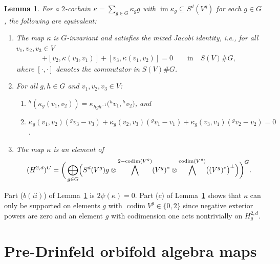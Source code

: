 \documentclass[pdftex]{sigma}
\numberwithin{equation}{section}
\newtheorem{Lemma}[Theorem]{Lemma}
\newcommand{\actby}[1]{{}^{#1}}
\DeclareMathOperator{\im}{im}
\DeclareMathOperator{\codim}{codim}
\begin{document}
\begin{Lemma}\label{ineedaname}
	For a $2$-cochain $\kappa=\sum_{g\in G}\kappa_g g$ with $\im \kappa_g\subseteq S^d(V^g)$ for each $g\in G$,
	the following are equivalent:
	\begin{enumerate}\itemsep=0pt
		\item[$(a)$] The map $\kappa$ is $G$-invariant and satisfies
		the mixed Jacobi identity, i.e., for all $v_1,v_2,v_3\in V$
		\begin{gather*}
		[v_1,\kappa(v_2,v_3)]+[v_2,\kappa(v_3,v_1)]+[v_3,\kappa(v_1,v_2)]=0\qquad
\text{in}\quad S(V)\# G,
		\end{gather*}
		where $[\cdot,\cdot]$ denotes the commutator in $S(V)\# G$.
		\item[$(b)$] For all $g,h\in G$ and $v_1,v_2,v_3\in V$:
		\begin{enumerate}\itemsep=0pt
			\item[$(i)$] $\actby{h}(\kappa_g(v_1,v_2))=\kappa_{hgh^{-1}}\big(\actby{h}v_1,\actby{h}v_2\big)$, and
			\item[$(ii)$] $\kappa_g(v_1,v_2)(\actby{g}v_3-v_3)
			+\kappa_g(v_2,v_3)(\actby{g}v_1-v_1)
			+\kappa_g(v_3,v_1)(\actby{g}v_2-v_2)=0$.
		\end{enumerate}
		\item[$(c)$] The map $\kappa$ is an element of
		\begin{gather*}
		(H^{2,d})^G=\bigg(\bigoplus_{g \in G}
		\Bigl(
		S^d(V^{g})g \otimes
		\bigwedge^{2-\codim(V^g)}(V^g)^{*} \otimes
		\bigwedge^{\codim(V^g)}\bigl((V^g)^*\bigr)^{\perp}
		\Bigr)\bigg)^G.
		\end{gather*}
	\end{enumerate}
\end{Lemma}

\begin{Remark}\label{remark:codim}
	Part ($b(ii)$) of Lemma~\ref{ineedaname} is $2\psi(\kappa)=0$.
	Part ($c$) of Lemma~\ref{ineedaname} shows that $\kappa$ can only be supported
	on elements $g$ with $\codim V^g\in\{0,2\}$ since negative exterior powers
	are zero and an element $g$ with codimension one acts nontrivially on $H_g^{2,d}$.
\end{Remark}

\section{Pre-Drinfeld orbifold algebra maps}\label{InvSkewSymmBilMaps}
\end{document}
